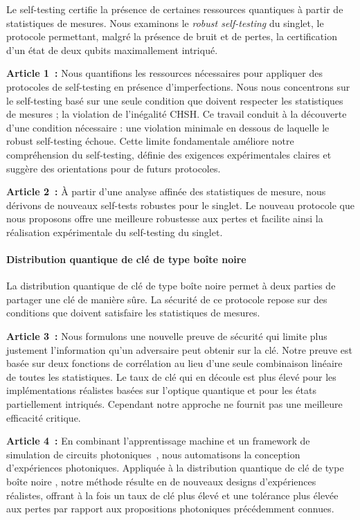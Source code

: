 Le self-testing certifie la présence de certaines ressources quantiques à partir de statistiques de mesures.
Nous examinons le \textit{robust self-testing} du singlet, le protocole permettant, malgré la présence de bruit et de pertes, la certification d'un état de deux qubits maximallement intriqué.

\medbreak

\textbf{Article 1~\cite{Valcarce2020}:} 
Nous quantifions les ressources nécessaires pour appliquer des protocoles de self-testing en présence d'imperfections.
Nous nous concentrons sur le self-testing basé sur une seule condition que doivent respecter les statistiques de mesures ; la violation de l'inégalité CHSH.
Ce travail conduit à la découverte d'une condition nécessaire : une violation minimale en dessous de laquelle le robust self-testing échoue.
Cette limite fondamentale améliore notre compréhension du self-testing, définie des exigences expérimentales claires et suggère des orientations pour de futurs protocoles.

\textbf{Article 2~\cite{Valcarce2022}:} 
À partir d'une analyse affinée des statistiques de mesure, nous dérivons de nouveaux self-tests robustes pour le singlet.
Le nouveau protocole que nous proposons offre une meilleure robustesse aux pertes et facilite ainsi la réalisation expérimentale du self-testing du singlet.

\paragraph{Distribution quantique de clé de type \guillemotleft boîte noire \guillemotright}

La distribution quantique de clé de type \guillemotleft boîte noire \guillemotright permet à deux parties de partager une clé de manière sûre.
La sécurité de ce protocole repose sur des conditions que doivent satisfaire les statistiques de mesures.

\medbreak

\textbf{Article 3~\cite{Sekatski2021}:}
Nous formulons une nouvelle preuve de sécurité qui limite plus justement l'information qu'un adversaire peut obtenir sur la clé.
Notre preuve est basée sur deux fonctions de corrélation au lieu d'une seule combinaison linéaire de toutes les statistiques.
Le taux de clé qui en découle est plus élevé pour les implémentations réalistes basées sur l'optique quantique et pour les états partiellement intriqués. 
Cependant notre approche ne fournit pas une meilleure efficacité critique.

\textbf{Article 4~\cite{Valcarce2022b}:} 
En combinant l'apprentissage machine et un framework de simulation de circuits photoniques~\cite{Valcarce2021}, nous automatisons la conception d'expériences photoniques.
Appliquée à la distribution quantique de clé de type \guillemotleft boîte noire \guillemotright, notre méthode résulte en de nouveaux designs d'expériences réalistes, offrant à la fois un taux de clé plus élevé et une tolérance plus élevée aux pertes par rapport aux propositions photoniques précédemment connues.

